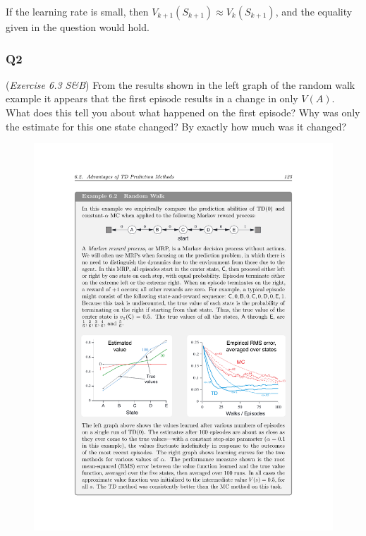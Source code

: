 \documentclass[a4paper, 10pt]{article}
\begin{document}
If the learning rate is small, then $V_{k+1}(S_{k+1}) \approx V_k(S_{k+1})$, and the equality given in the question would hold.

\subsubsection*{Q2}
(\textit{Exercise 6.3 S\&B})
From the results shown in the left graph of the random walk example it
appears that the first episode results in a change in only $V(A)$.
What does this tell you about what happened on the first episode?
Why was only the estimate for this one state changed?
By exactly how much was it changed?
\begin{figure}[h!]
\centering
\includegraphics[scale=0.9]{figures/c2m2_rw.pdf}
\end{figure}
\end{document}
